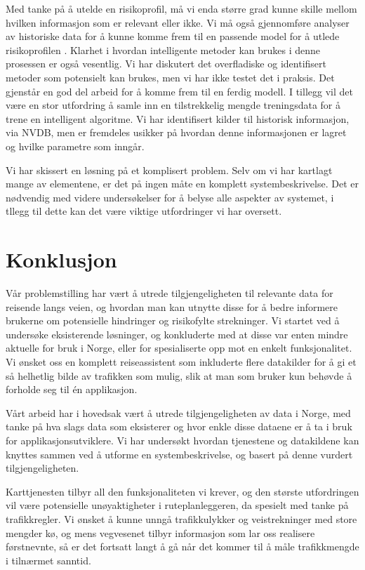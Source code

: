 \documentclass[a4paper,norsk,oneside]{book}
\begin{document}
Med tanke på å utelde en risikoprofil, må vi  enda større grad kunne skille mellom hvilken informasjon som er relevant eller ikke. Vi må også gjennomføre analyser av historiske data for å kunne komme frem til en passende model for å utlede risikoprofilen . Klarhet i hvordan intelligente metoder kan brukes i denne prosessen er også vesentlig.  Vi har diskutert det overfladiske og identifisert metoder som potensielt kan brukes, men vi har ikke testet det i praksis. Det gjenstår en god del arbeid for å komme frem til en ferdig modell. I tillegg vil det være en stor utfordring å samle inn en tilstrekkelig mengde treningsdata for å trene en intelligent algoritme. Vi har identifisert kilder til historisk informasjon, via NVDB, men er fremdeles usikker på hvordan denne informasjonen er lagret og hvilke parametre som inngår.

Vi har skissert en løsning på et komplisert problem. Selv om vi har kartlagt mange av elementene, er det på ingen måte en komplett systembeskrivelse. Det er nødvendig med videre undersøkelser for å belyse alle aspekter av systemet, i tllegg til dette kan det være viktige utfordringer vi har oversett. 

\section{Konklusjon}
\label{sec:konklusjon}

Vår problemstilling har vært å utrede tilgjengeligheten til relevante data for reisende langs veien, og hvordan man kan utnytte disse for å bedre informere brukerne om potensielle hindringer og risikofylte strekninger. Vi startet ved å undersøke eksisterende løsninger, og konkluderte med at disse var enten mindre aktuelle for bruk i Norge, eller for spesialiserte opp mot en enkelt funksjonalitet. Vi ønsket oss en komplett reiseassistent som inkluderte flere datakilder for å gi et så helhetlig bilde av trafikken som mulig, slik at man som bruker kun behøvde å forholde seg til én applikasjon.

Vårt arbeid har i hovedsak vært å utrede tilgjengeligheten av data i Norge, med tanke på hva slags data som eksisterer og hvor enkle disse dataene er å ta i bruk for applikasjonsutviklere. Vi har undersøkt hvordan tjenestene og datakildene kan knyttes sammen ved å utforme en systembeskrivelse, og basert på denne vurdert tilgjengeligheten.

Karttjenesten tilbyr all den funksjonaliteten vi krever, og den største utfordringen vil være potensielle unøyaktigheter i ruteplanleggeren, da spesielt med tanke på trafikkregler. Vi ønsket å kunne unngå trafikkulykker og veistrekninger med store mengder kø, og mens vegvesenet tilbyr informasjon som lar oss realisere førstnevnte, så er det fortsatt langt å gå når det kommer til å måle trafikkmengde i tilnærmet sanntid.
\end{document}
